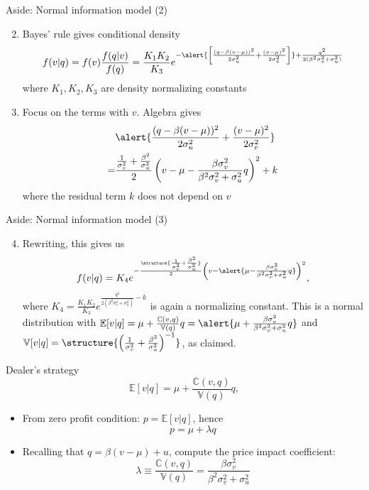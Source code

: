 \documentclass[english,10pt
,aspectratio=169
]{beamer}
\begin{document}
\begin{frame}{Aside: Normal information model (2)}
	\begin{enumerate}
		\setcounter{enumi}{1}
		\item Bayes' rule gives conditional density
		\[
		f(v|q) = f(v) \frac{f(q|v)}{f(q)} = \frac{K_1 K_2}{K_3} e^{-\alert{\left[\frac{(q-\beta(v-\mu))^2}{2\sigma^2_u }+\frac{(v-\mu)^2}{2\sigma^2_v}\right]} + \frac{q^2}{2(\beta^2 \sigma^2_v + \sigma^2_u)}}
		\]
		where $K_1, K_2, K_3$ are density normalizing constants
		\item Focus on the terms with \alert{$v$}. Algebra gives
		\begin{align*}
		&\alert{\frac{(q-\beta(v-\mu))^2}{2\sigma^2_u} + \frac{(v-\mu)^2}{2\sigma^2_v} }\\
		= &\frac{\frac{1}{\sigma^2_v}+\frac{\beta^2}{\sigma^2_u}}{2}\left(v-\mu-\frac{\beta \sigma^2_v}{\beta^2 \sigma^2_v + \sigma^2_u}q \right)^2 + k
		\end{align*}
		where the residual term $k$ does not depend on $v$
	\end{enumerate}
\end{frame}


\begin{frame}{Aside: Normal information model (3)}
	\begin{enumerate}
		\setcounter{enumi}{3}
		\item Rewriting, this gives us
		\[
			f(v|q) = K_4 e^{-\frac{\structure{\frac{1}{\sigma^2_v}+\frac{\beta^2}{\sigma^2_u}}}{2} \left(v-\alert{\mu-\frac{\beta \sigma^2_v}{\beta^2 \sigma^2_v + \sigma^2_u}q }\right)^2},
		\]
		where $K_4=\frac{K_1 K_2}{K_3}e^{ \frac{q^2}{2(\beta^2 \sigma^2_v + \sigma^2_u)}-k}$ is again a normalizing constant.
		This is  a normal distribution with $\mathbb{E}[v|q] = \mu + \frac{\mathbb{C}(v,q)}{\mathbb{V}(q)} q=\alert{\mu+\frac{\beta \sigma^2_v}{\beta^2 \sigma^2_v + \sigma^2_u}q}$ and $\mathbb{V}[v|q]=\structure{ \left( \frac{1}{\sigma^2_v}+\frac{\beta^2}{\sigma^2_u} \right)^{-1}}$, as claimed. 
	\end{enumerate}
\end{frame}


\begin{frame}{Dealer's strategy}
	\[
		\mathbb{E}[v|q] = \mu + \frac{\mathbb{C}(v,q)}{\mathbb{V}(q)} q,
	\]
	\begin{itemize}
		\item From zero profit condition: $p = \mathbb{E}[v|q]$, hence
		\[
			p = \mu + \lambda q
		\]
		\item Recalling that $q = \beta(v-\mu) + u$, compute the price impact coefficient: 
		\[
			\lambda \equiv \frac{\mathbb{C}(v,q)}{\mathbb{V}(q)} = \frac{\beta \sigma^2_v}{\beta^2 \sigma^2_v + \sigma^2_u}	
		\]
	\end{itemize}
\end{frame}
\end{document}

